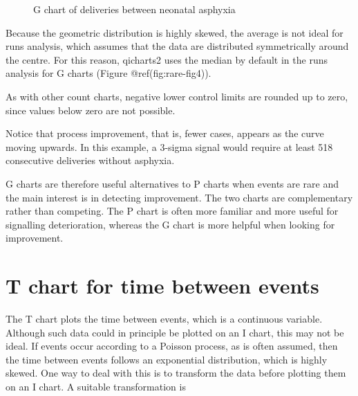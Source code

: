 \documentclass[
]{book}
\makeatletter
\newenvironment{Shaded}{\begin{snugshade}}{\end{snugshade}}
\newcommand{\AttributeTok}[1]{\textcolor[rgb]{0.13,0.29,0.53}{#1}}
\newcommand{\CommentTok}[1]{\textcolor[rgb]{0.56,0.35,0.01}{\textit{#1}}}
\newcommand{\FunctionTok}[1]{\textcolor[rgb]{0.13,0.29,0.53}{\textbf{#1}}}
\newcommand{\NormalTok}[1]{#1}
\newcommand{\OtherTok}[1]{\textcolor[rgb]{0.56,0.35,0.01}{#1}}
\newcommand{\SpecialCharTok}[1]{\textcolor[rgb]{0.81,0.36,0.00}{\textbf{#1}}}
\newcommand{\StringTok}[1]{\textcolor[rgb]{0.31,0.60,0.02}{#1}}
\newcommand*\pandocbounded[1]{%
  \sbox\pandoc@box{#1}%
  \Gscale@div\@tempa{\textheight}{\dimexpr\ht\pandoc@box+\dp\pandoc@box\relax}%
  \Gscale@div\@tempb{\linewidth}{\wd\pandoc@box}%
  \ifdim\@tempb\p@<\@tempa\p@\let\@tempa\@tempb\fi%
  \ifdim\@tempa\p@<\p@\scalebox{\@tempa}{\usebox\pandoc@box}%
  \else\usebox{\pandoc@box}%
  \fi%
}
\makeatother
\begin{document}
\begin{Shaded}
\end{Shaded}

\begin{figure}
\centering
\pandocbounded{}
\caption{G chart of deliveries between neonatal asphyxia}
\end{figure}

Because the geometric distribution is highly skewed, the average is not
ideal for runs analysis, which assumes that the data are distributed
symmetrically around the centre. For this reason, qicharts2 uses the
median by default in the runs analysis for G charts (Figure
@ref(fig:rare-fig4)).

As with other count charts, negative lower control limits are rounded up
to zero, since values below zero are not possible.

Notice that process improvement, that is, fewer cases, appears as the
curve moving upwards. In this example, a 3-sigma signal would require at
least 518 consecutive deliveries without asphyxia.

G charts are therefore useful alternatives to P charts when events are
rare and the main interest is in detecting improvement. The two charts
are complementary rather than competing. The P chart is often more
familiar and more useful for signalling deterioration, whereas the G
chart is more helpful when looking for improvement.

\section{T chart for time between
events}\label{t-chart-for-time-between-events}

The T chart plots the time between events, which is a continuous
variable. Although such data could in principle be plotted on an I
chart, this may not be ideal. If events occur according to a Poisson
process, as is often assumed, then the time between events follows an
exponential distribution, which is highly skewed. One way to deal with
this is to transform the data before plotting them on an I chart. A
suitable transformation is
\end{document}
